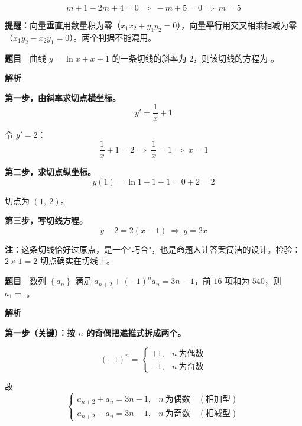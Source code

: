\[m+1-2m+4=0\ \Longrightarrow\ -m+5=0\ \Longrightarrow\ m=5\]


\begin{gktip}
\textbf{提醒}：向量\textbf{垂直}用数量积为零（$x_1x_2+y_1y_2=0$），向量\textbf{平行}用交叉相乘相减为零（$x_1y_2-x_2y_1=0$）。两个判据不能混用。
\end{gktip}

\par\medskip


\textbf{题目}　曲线 $y=\ln x+x+1$ 的一条切线的斜率为 $2$，则该切线的方程为 \gkblank{}。

\textbf{解析}

\textbf{第一步，由斜率求切点横坐标。}
\[y'=\frac1x+1\]

令 $y'=2$：
\[\frac1x+1=2\ \Longrightarrow\ \frac1x=1\ \Longrightarrow\ x=1\]

\textbf{第二步，求切点纵坐标。}
\[y(1)=\ln1+1+1=0+2=2\]

切点为 $(1,\ 2)$。

\textbf{第三步，写切线方程。}
\[y-2=2(x-1)\ \Longrightarrow\ y=2x\]


\begin{gktip}
\textbf{注}：这条切线恰好过原点，是一个"巧合"，也是命题人让答案简洁的设计。检验：$2\times1=2$  切点确实在切线上。
\end{gktip}

\par\medskip


\textbf{题目}　数列 $\left\{a_n\right\}$ 满足 $a_{n+2}+(-1)^{n}a_n=3n-1$，前 $16$ 项和为 $540$，则 $a_1=$ \gkblank{}。

\textbf{解析}

\textbf{第一步（关键）：按 $n$ 的奇偶把递推式拆成两个。}

\[(-1)^{n}=\begin{cases}+1,&n\ \text{为偶数}\\ -1,&n\ \text{为奇数}\end{cases}\]

故
\[\begin{cases}a_{n+2}+a_n=3n-1,&n\ \text{为偶数}\quad(\text{相加型})\\[1mm] a_{n+2}-a_n=3n-1,&n\ \text{为奇数}\quad(\text{相减型})\end{cases}\]

